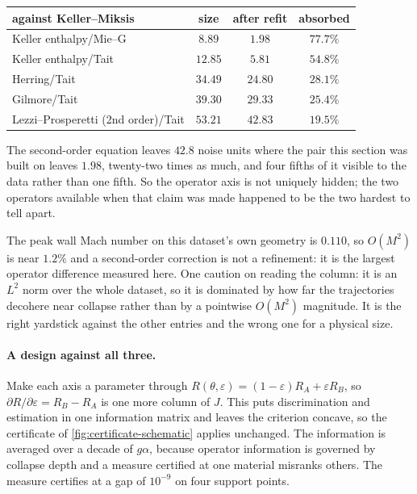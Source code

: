 \documentclass[10pt]{article}
\begin{document}
\begin{center}
\begin{tabular}{lccc}
\toprule
against Keller--Miksis & size & after refit & absorbed \\
\midrule
Keller enthalpy/Mie--G & $8.89$ & $\mathbf{1.98}$ & $\mathbf{77.7\%}$ \\
Keller enthalpy/Tait & $12.85$ & $5.81$ & $54.8\%$ \\
Herring/Tait & $34.49$ & $24.80$ & $28.1\%$ \\
Gilmore/Tait & $39.30$ & $29.33$ & $25.4\%$ \\
Lezzi--Prosperetti (2nd order)/Tait & $53.21$ & $\mathbf{42.83}$ & $\mathbf{19.5\%}$ \\
\bottomrule
\end{tabular}
\end{center}

\noindent The second-order equation leaves $42.8$ noise units where the pair this section was
built on leaves $1.98$, twenty-two times as much, and four fifths of it visible to the data
rather than one fifth. So the operator axis is not uniquely hidden; the two operators available
when that claim was made happened to be the two hardest to tell apart.

The peak wall Mach number on this dataset's own geometry is $0.110$, so $O(M^2)$ is near
$1.2\%$ and a second-order correction is not a refinement: it is the largest operator
difference measured here. One caution on reading the column: it is an $L^2$ norm over the whole
dataset, so it is dominated by how far the trajectories decohere near collapse rather than by a
pointwise $O(M^2)$ magnitude. It is the right yardstick against the other entries and the wrong
one for a physical size.

\paragraph{A design against all three.} Make each axis a parameter through
$R(\theta,\varepsilon)=(1-\varepsilon)R_A+\varepsilon R_B$, so $\partial R/\partial\varepsilon =
R_B-R_A$ is one more column of $J$. This puts discrimination and estimation in one information
matrix and leaves the criterion concave, so the certificate of
\cref{fig:certificate-schematic} applies unchanged. The information is averaged over a
decade of $g\alpha$, because operator information is governed by collapse depth and a measure
certified at one material misranks others. The measure certifies at a gap of $10^{-9}$ on four
support points.
\end{document}
